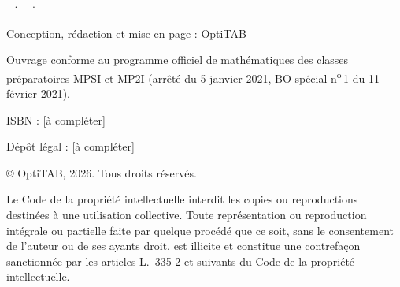 \thispagestyle{empty}
\vspace*{\fill}
\begin{minipage}{110mm}
\fontsize{8.5}{11.5}\selectfont\color{otMuted}
{\otSemi\fontsize{8.5}{11}\selectfont\color{otInk}\otTitreLivre\ · \otNiveau\ · \otSousTitre}\par
\vspace{2mm}
Conception, rédaction et mise en page : OptiTAB\par
Ouvrage conforme au programme officiel de mathématiques des classes
préparatoires MPSI et MP2I (arrêté du 5 janvier 2021, BO spécial n\textsuperscript{o}\,1
du 11 février 2021).\par
\vspace{4mm}
ISBN : [à compléter]\par
Dépôt légal : [à compléter]\par
\vspace{4mm}
© OptiTAB, 2026. Tous droits réservés.\par
\vspace{4mm}
Le Code de la propriété intellectuelle interdit les copies ou reproductions
destinées à une utilisation collective. Toute représentation ou reproduction
intégrale ou partielle faite par quelque procédé que ce soit, sans le
consentement de l'auteur ou de ses ayants droit, est illicite et constitue une
contrefaçon sanctionnée par les articles L.~335-2 et suivants du Code de la
propriété intellectuelle.\par
\end{minipage}
\clearpage
